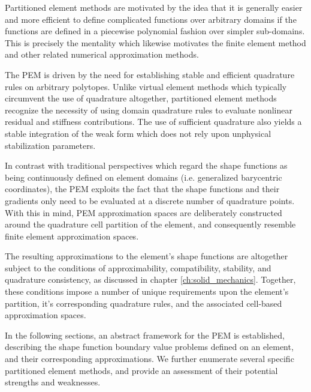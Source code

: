 Partitioned element methods are motivated by the idea that it is generally easier and more efficient to define complicated functions over arbitrary domains if the functions are defined in a piecewise polynomial fashion over simpler sub-domains. This is precisely the mentality which likewise motivates the finite element method and other related numerical approximation methods.

The PEM is driven by the need for establishing stable and efficient quadrature rules on arbitrary polytopes. Unlike virtual element methods which typically circumvent the use of quadrature altogether, partitioned element methods recognize the necessity of using domain quadrature rules to evaluate nonlinear residual and stiffness contributions. The use of sufficient quadrature also yields a stable integration of the weak form which does not rely upon unphysical stabilization parameters.

In contrast with traditional perspectives which regard the shape functions as being continuously defined on element domains (i.e. generalized barycentric coordinates), the PEM exploits the fact that the shape functions and their gradients only need to be evaluated at a discrete number of quadrature points. With this in mind, PEM approximation spaces are deliberately constructed around the quadrature cell partition of the element, and consequently resemble finite element approximation spaces.

The resulting approximations to the element's shape functions are altogether subject to the conditions of approximability, compatibility, stability, and quadrature consistency, as discussed in chapter \ref{ch:solid_mechanics}. Together, these conditions impose a number of unique requirements upon the element's partition, it's corresponding quadrature rules, and the associated cell-based approximation spaces.

In the following sections, an abstract framework for the PEM is established, describing the shape function boundary value problems defined on an element, and their corresponding approximations. We further enumerate several specific partitioned element methods, and provide an assessment of their potential strengths and weaknesses.


